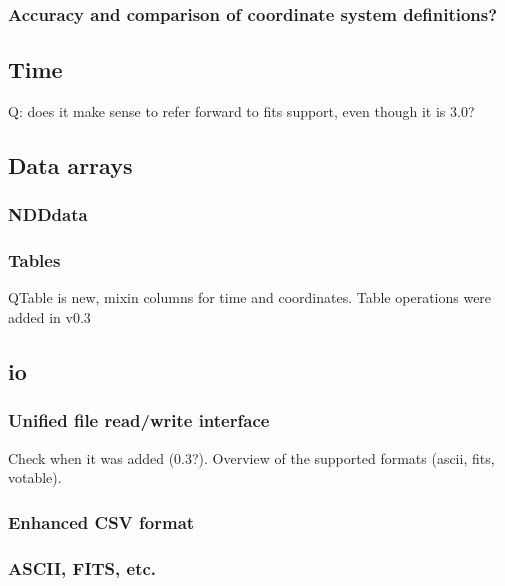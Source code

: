 \documentclass[modern]{aastex61}
\begin{document}
\subsubsection{Accuracy and comparison of coordinate system definitions?}

\subsection{Time}
\label{sec:time}

Q: does it make sense to refer forward to fits support, even though it is 3.0?

\subsection{Data arrays}

\subsubsection{NDDdata}

\subsubsection{Tables}
\label{sec:table}
QTable is new, mixin columns for time and coordinates. Table operations were added in v0.3

\subsection{io}

\subsubsection{Unified file read/write interface}

Check when it was added (0.3?). Overview of the supported formats (ascii, fits, votable).

\subsubsection{Enhanced CSV format}

\subsubsection{ASCII, FITS, etc.}
\end{document}
